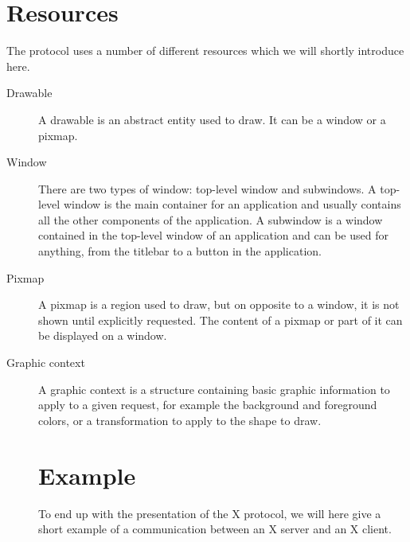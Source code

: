 \section{Resources}
The protocol uses a number of different resources which we will shortly 
introduce here.
\begin{description}
\item[Drawable] A drawable is an abstract entity used to draw. It can be a window or a pixmap.
\item[Window] There are two types of window: top-level window and subwindows. 
  A top-level window is the main container for an application and 
  usually contains all the other components of the application.
  A subwindow is a window contained in the top-level window of an application 
  and can be used for anything, from the titlebar to a button in the application.
\item[Pixmap] A pixmap is a region used to draw, but on opposite to a window, 
  it is not shown until explicitly requested. The content of a pixmap 
  or part of it can be displayed on a window.
\item[Graphic context] A graphic context is a structure containing basic graphic 
  information to apply to a given request, for example the background and 
  foreground colors, or a transformation to apply to the shape to draw.
\section{Example}
To end up with the presentation of the X protocol, we will here give a
short example of a communication between an X server and an X client.
\end{description}
